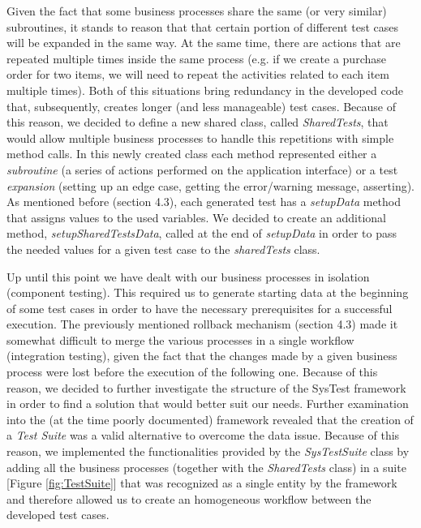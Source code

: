 Given the fact that some business processes share the same (or very similar) subroutines, it stands to reason that that certain portion of different test cases will be expanded in the same way. At the same time, there are actions that are repeated multiple times inside the same process (e.g. if we create a purchase order for two items, we will need to repeat the activities related to each item multiple times). Both of this situations bring redundancy in the developed code that, subsequently, creates longer (and less manageable) test cases. Because of this reason, we decided to define a new shared class, called \textit{SharedTests}, that would allow multiple business processes to handle this repetitions with simple method calls. In this newly created class each method represented either a \textit{subroutine} (a series of actions performed on the application interface) or a test \textit{expansion} (setting up an edge case, getting the error/warning message, asserting). As mentioned before (section 4.3), each generated test has a \textit{setupData} method that assigns values to the used variables. We decided to create an additional method, \textit{setupSharedTestsData}, called at the end of \textit{setupData} in order to pass the needed values for a given test case to the \textit{sharedTests} class.

Up until this point we have dealt with our business processes in isolation (component testing). This required us to generate starting data at the beginning of some test cases in order to have the necessary prerequisites for a successful execution. The previously mentioned rollback mechanism (section 4.3) made it somewhat difficult to merge the various processes in a single workflow (integration testing), given the fact that the changes made by a given business process were lost before the execution of the following one. Because of this reason, we decided to further investigate the structure of the SysTest framework in order to find a solution that would better suit our needs.
Further examination into the (at the time poorly documented) framework revealed that the creation of a \textit{Test Suite} was a valid alternative to overcome the data issue. Because of this reason, we implemented the functionalities provided by the \textit{SysTestSuite} class by adding all the business processes (together with the \textit{SharedTests} class) in a suite [Figure \ref{fig:TestSuite}] that was recognized as a single entity by the framework and therefore allowed us to create an homogeneous workflow between the developed test cases.

